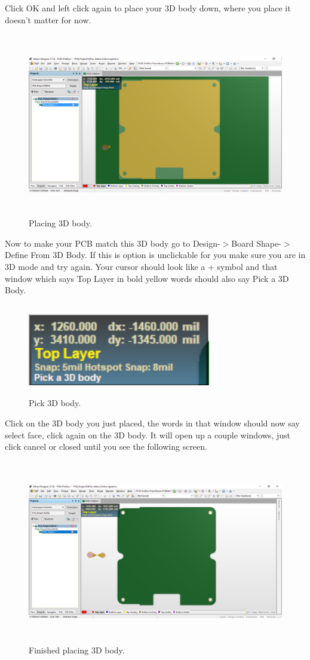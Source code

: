 \documentclass{report}
\begin{document}
	Click OK and left click again to place your 3D body down, where you place it doesn't matter for now.
	\begin{figure}[H]	
		\centering
		\includegraphics[width=16cm, height=8cm]{pics/3d_body_pic1.png}
		\caption{Placing 3D body.}
		\label{fig 3}
	\end{figure}
	Now to make your PCB match this 3D body go to Design-$>$Board Shape-$>$Define From 3D Body. If this is option is unclickable for you make sure you are in 3D mode and try again. Your cursor should look like a + symbol and that window which says Top Layer in bold yellow words should also say Pick a 3D Body.
	\begin{figure}[H]	
		\centering
		\includegraphics[width=8cm, height=4cm]{pics/pick_3d_body.png}
		\caption{Pick 3D body.}
		\label{fig 4}
	\end{figure}
	Click on the 3D body you just placed, the words in that window should now say select face, click again on the 3D body. It will open up a couple windows, just click cancel or closed until you see the following screen.

	\begin{figure}[H]	
		\centering
		\includegraphics[width=16cm, height=8cm]{pics/3d_body_pic2.png}
		\caption{Finished placing 3D body.}
		\label{fig 5}
	\end{figure}
\end{document}
